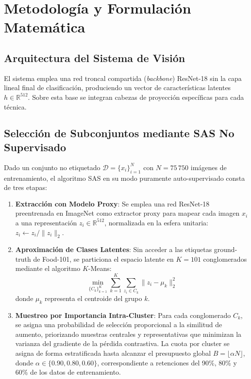 \section{Metodología y Formulación Matemática}
\label{sec:methodology}

\subsection{Arquitectura del Sistema de Visión}
El sistema emplea una red troncal compartida (\textit{backbone}) ResNet-18 \cite{he2016resnet} sin la capa lineal final de clasificación, produciendo un vector de características latentes $h \in \mathbb{R}^{512}$. Sobre esta base se integran cabezas de proyección específicas para cada técnica.

\subsection{Selección de Subconjuntos mediante SAS No Supervisado}
Dado un conjunto no etiquetado $\mathcal{D} = \{x_i\}_{i=1}^N$ con $N = 75\,750$ imágenes de entrenamiento, el algoritmo SAS \cite{joshi2023sas} en su modo puramente auto-supervisado consta de tres etapas:

\begin{enumerate}
    \item \textbf{Extracción con Modelo Proxy}: Se emplea una red ResNet-18 preentrenada en ImageNet como extractor proxy para mapear cada imagen $x_i$ a una representación $z_i \in \mathbb{R}^{512}$, normalizada en la esfera unitaria: $z_i \leftarrow z_i / \|z_i\|_2$.
    \item \textbf{Aproximación de Clases Latentes}: Sin acceder a las etiquetas ground-truth de Food-101, se particiona el espacio latente en $K = 101$ conglomerados mediante el algoritmo $K$-Means:
    \begin{equation}
    \min_{\{C_k\}_{k=1}^K} \sum_{k=1}^K \sum_{z_i \in C_k} \|z_i - \mu_k\|_2^2
    \end{equation}
    donde $\mu_k$ representa el centroide del grupo $k$.
    \item \textbf{Muestreo por Importancia Intra-Cluster}: Para cada conglomerado $C_k$, se asigna una probabilidad de selección proporcional a la similitud de aumento, priorizando muestras centrales y representativas que minimizan la varianza del gradiente de la pérdida contrastiva. La cuota por cluster se asigna de forma estratificada hasta alcanzar el presupuesto global $B = \lfloor \alpha N \rfloor$, donde $\alpha \in \{0.90, 0.80, 0.60\}$, correspondiente a retenciones del 90\%, 80\% y 60\% de los datos de entrenamiento.
\end{enumerate}

